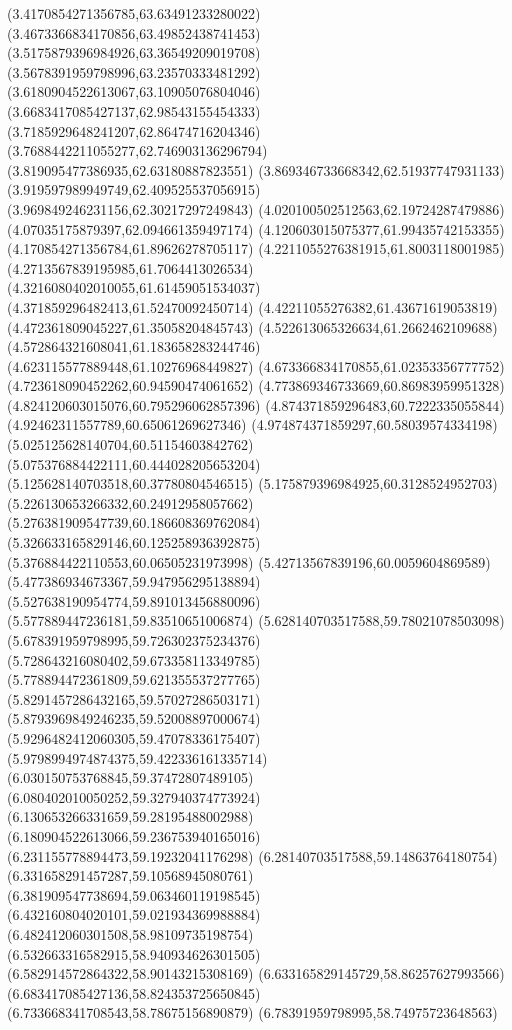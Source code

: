 {(3.4170854271356785,63.63491233280022)
(3.4673366834170856,63.49852438741453)
(3.5175879396984926,63.36549209019708)
(3.5678391959798996,63.23570333481292)
(3.6180904522613067,63.10905076804046)
(3.6683417085427137,62.98543155454333)
(3.7185929648241207,62.86474716204346)
(3.7688442211055277,62.746903136296794)
(3.819095477386935,62.63180887823551)
(3.869346733668342,62.51937747931133)
(3.919597989949749,62.409525537056915)
(3.969849246231156,62.30217297249843)
(4.020100502512563,62.19724287479886)
(4.07035175879397,62.094661359497174)
(4.120603015075377,61.99435742153355)
(4.170854271356784,61.89626278705117)
(4.2211055276381915,61.8003118001985)
(4.2713567839195985,61.7064413026534)
(4.3216080402010055,61.61459051534037)
(4.371859296482413,61.52470092450714)
(4.42211055276382,61.43671619053819)
(4.472361809045227,61.35058204845743)
(4.522613065326634,61.2662462109688)
(4.572864321608041,61.183658283244746)
(4.623115577889448,61.10276968449827)
(4.673366834170855,61.02353356777752)
(4.723618090452262,60.94590474061652)
(4.773869346733669,60.86983959951328)
(4.824120603015076,60.795296062857396)
(4.874371859296483,60.7222335055844)
(4.92462311557789,60.65061269627346)
(4.974874371859297,60.58039574334198)
(5.025125628140704,60.51154603842762)
(5.075376884422111,60.444028205653204)
(5.125628140703518,60.37780804546515)
(5.175879396984925,60.3128524952703)
(5.226130653266332,60.24912958057662)
(5.276381909547739,60.186608369762084)
(5.326633165829146,60.125258936392875)
(5.376884422110553,60.06505231973998)
(5.42713567839196,60.0059604869589)
(5.477386934673367,59.947956295138894)
(5.527638190954774,59.891013456880096)
(5.577889447236181,59.83510651006874)
(5.628140703517588,59.78021078503098)
(5.678391959798995,59.726302375234376)
(5.728643216080402,59.673358113349785)
(5.778894472361809,59.621355537277765)
(5.8291457286432165,59.57027286503171)
(5.8793969849246235,59.52008897000674)
(5.9296482412060305,59.47078336175407)
(5.9798994974874375,59.422336161335714)
(6.030150753768845,59.37472807489105)
(6.080402010050252,59.327940374773924)
(6.130653266331659,59.28195488002988)
(6.180904522613066,59.236753940165016)
(6.231155778894473,59.19232041176298)
(6.28140703517588,59.14863764180754)
(6.331658291457287,59.10568945080761)
(6.381909547738694,59.063460119198545)
(6.432160804020101,59.021934369988884)
(6.482412060301508,58.98109735198754)
(6.532663316582915,58.940934626301505)
(6.582914572864322,58.90143215308169)
(6.633165829145729,58.86257627993566)
(6.683417085427136,58.824353725650845)
(6.733668341708543,58.78675156890879)
(6.78391959798995,58.74975723648563)
}
